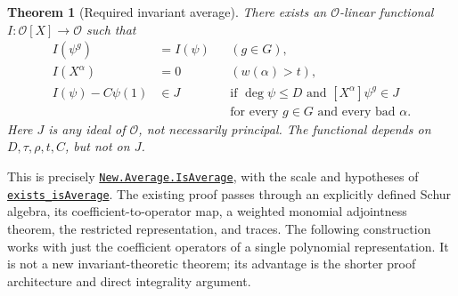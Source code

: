 \documentclass[11pt]{article}
\newtheorem{theorem}{Theorem}[section]
\newcommand{\OO}{\mathcal O}
\newcommand{\anchor}[3]{\href{https://github.com/VladimirReshetnikov/ProveIt/blob/17bf37ab3b6740d5d7430065d2f2a1a2a03e8a0e/Analysis/GeneralizedRiemannHypothesis/Lean/grh/src/#1.lean\#L#2}{\texttt{#3}}}
\begin{document}
\begin{theorem}[Required invariant average]\label{thm:avg}
There exists an $\OO$-linear functional $I:\OO[X]\to\OO$ such that
\begin{align*}
 I(\psi^g)&=I(\psi) &&(g\in G),\\
 I(X^\alpha)&=0 &&(w(\alpha)>t),\\
 I(\psi)-C\psi(1)&\in J &&\text{if }\deg\psi\le D\text{ and }[X^\alpha]\psi^g\in J\\[-2pt]
 &&&\text{for every }g\in G\text{ and every bad }\alpha.
\end{align*}
Here $J$ is any ideal of $\OO$, not necessarily principal. The functional depends on $D,\tau,\rho,t,C$, but not on $J$.
\end{theorem}
This is precisely \anchor{New/UpperBound/ElementaryDivisors/InvariantAverage}{262}{New.Average.IsAverage}, with the scale and hypotheses of \anchor{New/UpperBound/ElementaryDivisors/InvariantAverage}{946}{exists\_isAverage}. The existing proof passes through an explicitly defined Schur algebra, its coefficient-to-operator map, a weighted monomial adjointness theorem, the restricted representation, and traces. The following construction works with just the coefficient operators of a single polynomial representation. It is not a new invariant-theoretic theorem; its advantage is the shorter proof architecture and direct integrality argument.
\end{document}
